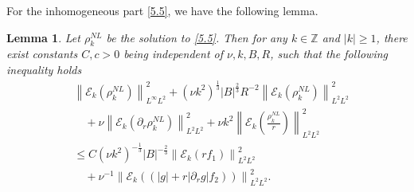 \documentclass[final, 12pt,reqno]{amsart}
\newtheorem{lemma}[theorem]{\bf Lemma}
\numberwithin{equation}{section}
\begin{document}
For the inhomogeneous part \eqref{5.5},
we have the following  lemma.
\begin{lemma}\label{lem5.6}
 Let $\rho_k^{NL}$ be the solution to \eqref{5.5}. Then for any $k \in \mathbb{Z}$ and $|k| \geq 1$, there exist constants $C, c>0$ being independent of $\nu, k, B, R$, such that the following inequality holds
    $$
 \begin{aligned}
    &   \left\|\mathcal{E}_k(\rho_k^{NL})\right\|_{L^\infty L^2}^2 +\left(\nu k^2\right)^{\frac{1}{3}}|B|^{\frac{2}{3}} R^{-2}\left\|\mathcal{E}_k (\rho_k^{NL})\right\|_{L^2 L^2}^2\\
    &\quad+ \nu\left\|\mathcal{E}_k(\partial_{r}\rho_k^{NL})\right\|_{L^2L^2}^2 +\nu k^2\left\|\mathcal{E}_k(\frac{\rho_k^{NL}}{r})\right\|_{L^2L^2}^2\\
    &\leq C\left(\nu k^2\right)^{-\frac{1}{3}}|B|^{-\frac{2}{3}}\left\|\mathcal{E}_k (rf_1)\right\|_{L^2 L^2}^2\\
  &\quad +\nu^{-1}\left\|\mathcal{E}_k((|g|+r|\partial_{r}g|f_2))\right\|_{L^2L^2}^2.
 \end{aligned}
 $$
  \end{lemma}
\end{document}
